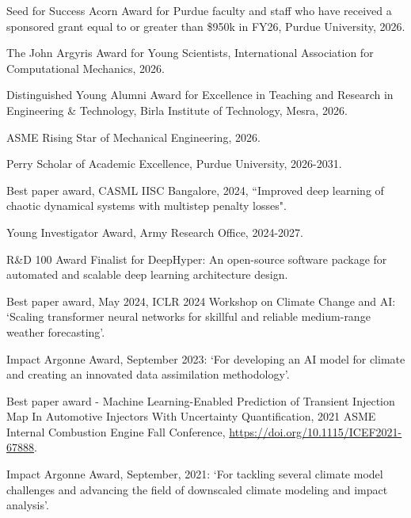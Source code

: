 \documentclass[letterpaper]{article}
\renewenvironment{itemize}{
  \begin{list}{}{
    \setlength{\leftmargin}{1.5em}
  }
}{
  \end{list}
}
\begin{document}
\begin{itemize}

\item Seed for Success Acorn Award for Purdue faculty and staff who have received a sponsored grant equal to or greater than \$950k in FY26, Purdue University, 2026. 

\item The John Argyris Award for Young Scientists, International Association for Computational Mechanics, 2026.

\item Distinguished Young Alumni Award for Excellence in Teaching and Research in Engineering \& Technology, Birla Institute of Technology, Mesra, 2026.

\item ASME Rising Star of Mechanical Engineering, 2026.

\item Perry Scholar of Academic Excellence, Purdue University, 2026-2031.

\item Best paper award, CASML IISC Bangalore, 2024, ``Improved deep learning of chaotic dynamical systems with multistep penalty losses".

\item Young Investigator Award, Army Research Office, 2024-2027.

\item R\&D 100 Award Finalist for DeepHyper: An open-source software package for automated and scalable deep learning architecture design.

\item Best paper award, May 2024, ICLR 2024 Workshop on Climate Change and AI: `Scaling transformer neural networks for skillful and reliable medium-range weather forecasting'.

\item Impact Argonne Award, September 2023: `For developing an AI model for climate and creating an innovated data assimilation methodology'.

\item Best paper award - Machine Learning-Enabled Prediction of Transient Injection Map In Automotive Injectors With Uncertainty Quantification, 2021 ASME Internal Combustion Engine Fall Conference, \url{https://doi.org/10.1115/ICEF2021-67888}.

\item Impact Argonne Award, September, 2021: `For tackling several climate model challenges and advancing the field of downscaled climate modeling and impact analysis'.


\end{itemize}
\end{document}
